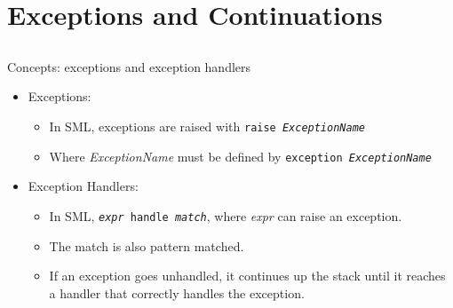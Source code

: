 \section{Exceptions and Continuations}\label{sec:Exceptions_Continuations}

\subsection{}
Concepts: exceptions and exception handlers

\begin{itemize}
\item Exceptions:
  \begin{itemize}[noitemsep]
  \item In SML, exceptions are raised with \texttt{raise \textit{ExceptionName}}
  \item Where \textit{ExceptionName} must be defined by \texttt{exception \textit{ExceptionName}}
  \end{itemize}

\item Exception Handlers:
  \begin{itemize}[noitemsep]
  \item In SML, \texttt{\textit{expr} handle \textit{match}}, where \textit{expr} can raise an exception.
  \item The match is also pattern matched.
  \item If an exception goes unhandled, it continues up the stack until it reaches a handler that correctly handles the exception.
  \end{itemize}
\end{itemize}

